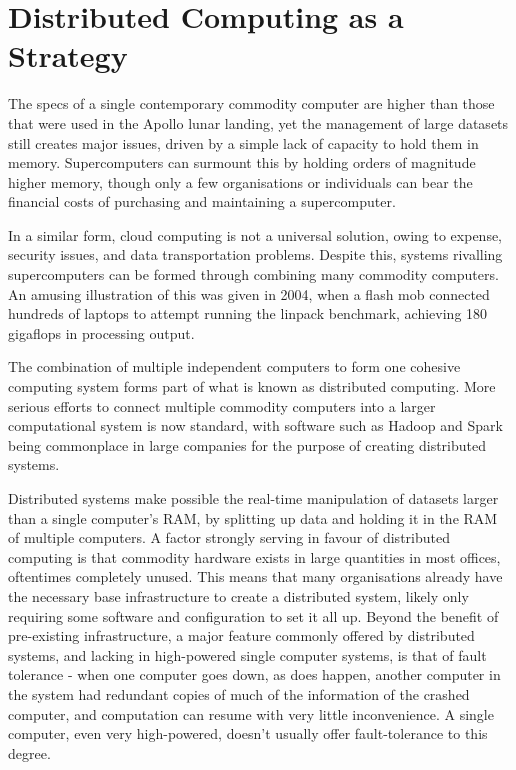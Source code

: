\hypertarget{sec:dist}{%
	\section{Distributed Computing as a Strategy}\label{sec:dist}}

The specs of a single contemporary commodity computer are higher than
those that were used in the Apollo lunar landing, yet the management of
large datasets still creates major issues, driven by a simple lack of
capacity to hold them in memory. Supercomputers can surmount this by
holding orders of magnitude higher memory, though only a few
organisations or individuals can bear the financial costs of purchasing
and maintaining a supercomputer.

In a similar form, cloud computing is not a universal solution, owing to
expense, security issues, and data transportation problems. Despite
this, systems rivalling supercomputers can be formed through combining
many commodity computers. An amusing illustration of this was given in
2004, when a flash mob connected hundreds of laptops to attempt running
the linpack benchmark, achieving 180 gigaflops in processing
output\cite{perry2004flashcomp}.

The combination of multiple independent computers to form one cohesive
computing system forms part of what is known as distributed computing.
More serious efforts to connect multiple commodity computers into a
larger computational system is now standard, with software such as
Hadoop and Spark being commonplace in large companies for the purpose of
creating distributed systems.

Distributed systems make possible the real-time manipulation of datasets
larger than a single computer's RAM, by splitting up data and holding it
in the RAM of multiple computers. A factor strongly serving in favour of
distributed computing is that commodity hardware exists in large
quantities in most offices, oftentimes completely unused. This means
that many organisations already have the necessary base infrastructure
to create a distributed system, likely only requiring some software and
configuration to set it all up. Beyond the benefit of pre-existing
infrastructure, a major feature commonly offered by distributed systems,
and lacking in high-powered single computer systems, is that of fault
tolerance - when one computer goes down, as does happen, another
computer in the system had redundant copies of much of the information
of the crashed computer, and computation can resume with very little
inconvenience. A single computer, even very high-powered, doesn't
usually offer fault-tolerance to this degree.

